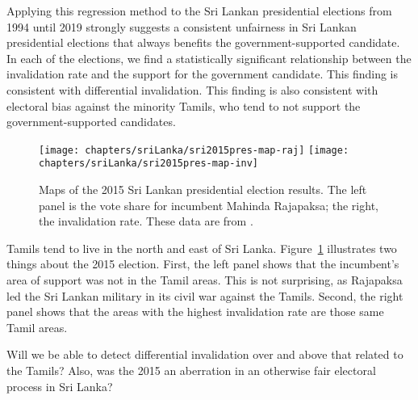 Applying this regression method to the Sri Lankan presidential elections from 1994 until 2019 strongly suggests a consistent unfairness in Sri Lankan presidential elections that always benefits the government-supported candidate. In each of the elections, we find a statistically significant relationship between the invalidation rate and the support for the government candidate. This finding is consistent with differential invalidation. This finding is also consistent with electoral bias against the minority Tamils, who tend to not support the government-supported candidates. 



\begin{figure}
\begin{center}
\texttt{[image: chapters/sriLanka/sri2015pres-map-raj]}
\hfill
\texttt{[image: chapters/sriLanka/sri2015pres-map-inv]}
\end{center}
\caption[Map of 2015 Sri Lankan presidential election results.]{Maps of the 2015 Sri Lankan presidential election results. The left panel is the vote share for incumbent Mahinda Rajapaksa; the right, the invalidation rate. These data are from \cite{sri2015pres}.}
\label{fig:sriLanka-sri2015pres}
\end{figure}


Tamils tend to live in the north and east of Sri Lanka. Figure~\ref{fig:sriLanka-sri2015pres} illustrates two things about the 2015 election. First, the left panel shows that the incumbent's area of support was not in the Tamil areas. This is not surprising, as Rajapaksa led the Sri Lankan military in its civil war against the Tamils. Second, the right panel shows that the areas with the highest invalidation rate are those same Tamil areas.

Will we be able to detect differential invalidation over and above that related to the Tamils? Also, was the 2015 an aberration in an otherwise fair electoral process in Sri Lanka?
























